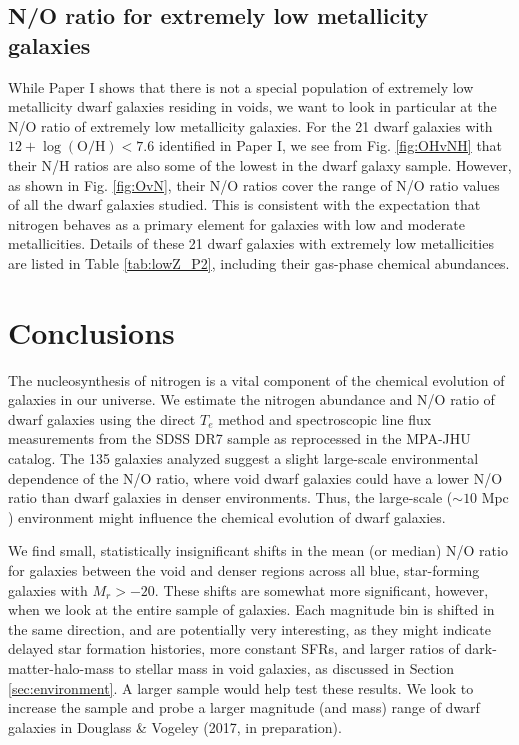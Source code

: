 \subsection{N/O ratio for extremely low metallicity galaxies}

While Paper I shows that there is not a special population of extremely low 
metallicity dwarf galaxies residing in voids, we want to look in particular at 
the N/O ratio of extremely low metallicity galaxies.  For the 21 dwarf galaxies 
with $12 + \log (\text{O}/\text{H}) < 7.6$ identified in Paper I, we see from 
Fig. \ref{fig:OHvNH} that their N/H ratios are also some of the lowest in the 
dwarf galaxy sample.  However, as shown in Fig. \ref{fig:OvN}, their N/O ratios 
cover the range of N/O ratio values of all the dwarf galaxies studied.  This is 
consistent with the expectation that nitrogen behaves as a primary element for 
galaxies with low and moderate metallicities.  Details of these 21 dwarf 
galaxies with extremely low metallicities are listed in Table \ref{tab:lowZ_P2}, 
including their gas-phase chemical abundances.




%
%
\section{Conclusions}

The nucleosynthesis of nitrogen is a vital component of the chemical evolution 
of galaxies in our universe.  We estimate the nitrogen abundance and N/O ratio 
of dwarf galaxies using the direct $T_e$ method and spectroscopic line flux 
measurements from the SDSS DR7 sample as reprocessed in the MPA-JHU catalog.  
The 135 galaxies analyzed suggest a slight large-scale environmental dependence 
of the N/O ratio, where void dwarf galaxies could have a lower N/O ratio than 
dwarf galaxies in denser environments.  Thus, the large-scale 
($\sim 10\text{ Mpc}$) environment might influence the chemical evolution of 
dwarf galaxies.

We find small, statistically insignificant shifts in the mean (or median) N/O 
ratio for galaxies between the void and denser regions across all blue, 
star-forming galaxies with $M_r > -20$.  These shifts are somewhat more 
significant, however, when we look at the entire sample of galaxies.  Each 
magnitude bin is shifted in the same direction, and are potentially very 
interesting, as they might indicate delayed star formation histories, more 
constant SFRs, and larger ratios of dark-matter-halo-mass to stellar mass in 
void galaxies, as discussed in Section \ref{sec:environment}.  A larger sample 
would help test these results.  We look to increase the sample and probe a 
larger magnitude (and mass) range of dwarf galaxies in Douglass \& Vogeley 
(2017, in preparation).

